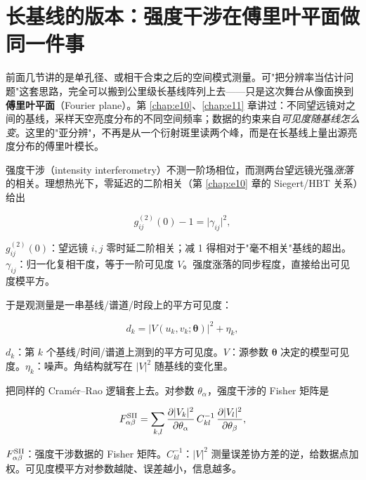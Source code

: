 \section{长基线的版本：强度干涉在傅里叶平面做同一件事}
\label{sec:e12-sii}

前面几节讲的是单孔径、或相干合束之后的空间模式测量。可"把分辨率当估计问题"这套思路，完全可以搬到公里级长基线阵列上去——只是这次舞台从像面换到\textbf{傅里叶平面}（Fourier plane）。第 \ref{chap:e10}、\ref{chap:e11} 章讲过：不同望远镜对之间的基线，采样天空亮度分布的不同空间频率；数据的约束来自\emph{可见度随基线怎么变}。这里的"亚分辨"，不再是从一个衍射斑里读两个峰，而是在长基线上量出源亮度分布的傅里叶模长。

强度干涉（intensity interferometry）不测一阶场相位，而测两台望远镜光强\emph{涨落}的相关。理想热光下，零延迟的二阶相关（第 \ref{chap:e10} 章的 Siegert/HBT 关系）给出

\begin{equation}
  g_{ij}^{(2)}(0)-1=\big|\gamma_{ij}\big|^{2},
  \label{eq:e12-hbt}
\end{equation}
\begin{formulaexplain}
\(g_{ij}^{(2)}(0)\)：望远镜 \(i,j\) 零时延二阶相关；减 1 得相对于"毫不相关"基线的超出。\(\gamma_{ij}\)：归一化复相干度，等于一阶可见度 \(V\)。强度涨落的同步程度，直接给出可见度模平方。
\end{formulaexplain}

于是观测量是一串基线/谱道/时段上的平方可见度：

\begin{equation}
  d_{k}=\big|V(u_k,v_k;\bm\theta)\big|^{2}+\eta_{k},
  \label{eq:e12-sii-data}
\end{equation}
\begin{formulaexplain}
\(d_k\)：第 \(k\) 个基线/时间/谱道上测到的平方可见度。\(V\)：源参数 \(\bm\theta\) 决定的模型可见度。\(\eta_k\)：噪声。角结构就写在 \(|V|^2\) 随基线的变化里。
\end{formulaexplain}

把同样的 Cramér--Rao 逻辑套上去。对参数 \(\theta_\alpha\)，强度干涉的 Fisher 矩阵是

\begin{equation}
  F_{\alpha\beta}^{\rm SII}
  =\sum_{k,l}
  \frac{\partial|V_k|^{2}}{\partial\theta_\alpha}\,
  C^{-1}_{kl}\,
  \frac{\partial|V_l|^{2}}{\partial\theta_\beta},
  \label{eq:e12-sii-fisher}
\end{equation}
\begin{formulaexplain}
\(F_{\alpha\beta}^{\rm SII}\)：强度干涉数据的 Fisher 矩阵。\(C^{-1}_{kl}\)：\(|V|^2\) 测量误差协方差的逆，给数据点加权。可见度模平方对参数越陡、误差越小，信息越多。
\end{formulaexplain}

